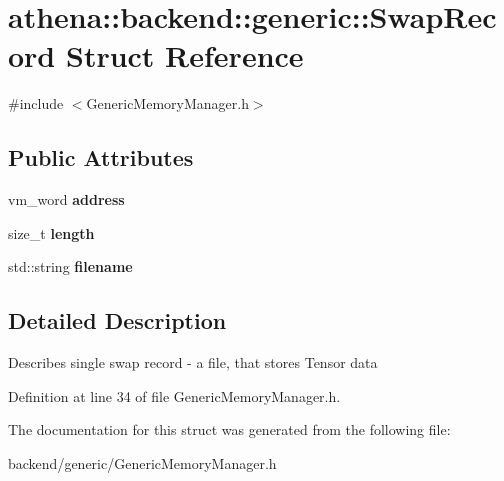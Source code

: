 \hypertarget{structathena_1_1backend_1_1generic_1_1_swap_record}{}\section{athena\+:\+:backend\+:\+:generic\+:\+:Swap\+Record Struct Reference}
\label{structathena_1_1backend_1_1generic_1_1_swap_record}


{\ttfamily \#include $<$Generic\+Memory\+Manager.\+h$>$}

\subsection*{Public Attributes}
\begin{DoxyCompactItemize}
\item 
\mbox{\label{structathena_1_1backend_1_1generic_1_1_swap_record_ac3ffe37973d1992220844a94c8b6afcb}} 
vm\+\_\+word {\bfseries address}
\item 
\mbox{\label{structathena_1_1backend_1_1generic_1_1_swap_record_ad4851011bc4d109f47c5610e817978de}} 
size\+\_\+t {\bfseries length}
\item 
\mbox{\label{structathena_1_1backend_1_1generic_1_1_swap_record_ae3f76aea814f0e9b0d6fabbfa349c54a}} 
std\+::string {\bfseries filename}
\end{DoxyCompactItemize}


\subsection{Detailed Description}
Describes single swap record -\/ a file, that stores Tensor data 

Definition at line 34 of file Generic\+Memory\+Manager.\+h.



The documentation for this struct was generated from the following file\+:\begin{DoxyCompactItemize}
\item 
backend/generic/Generic\+Memory\+Manager.\+h\end{DoxyCompactItemize}

